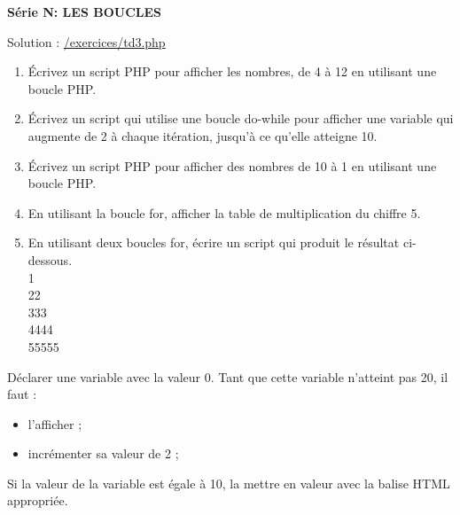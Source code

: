 \documentclass[10pt,a4paper,notitlepage]{article}
\begin{document}
	
	\begin{center}
		\large{\textbf{Série N: \textsc{LES BOUCLES}}}
	\end{center}
	
	Solution : \href{https://exercicesdephp.000webhostapp.com/exercices/td3.php}{\color{blue} /exercices/td3.php}
	\begin{definition}
		\hspace{2ex} 
		\begin{enumerate}
			\item Écrivez un script PHP pour afficher les nombres, de 4 à 12 en utilisant une boucle PHP. 
			\item Écrivez un script  qui utilise une boucle do-while pour afficher une variable qui augmente de 2 à chaque itération, jusqu'à ce qu'elle atteigne 10.
			\item Écrivez un script PHP pour afficher des nombres de 10 à 1 en utilisant une boucle PHP.
			\item En utilisant la boucle for, afficher la table de multiplication du chiffre 5.
			\item En utilisant deux boucles for, écrire un script qui produit le résultat ci-dessous.\\
			1\\
			22\\
			333\\
			4444\\
			55555
		\end{enumerate}
		
	\end{definition}
	\begin{definition}
		\hspace{2ex} Déclarer une variable avec la valeur 0. Tant que cette variable n'atteint pas 20, il faut :
		\begin{itemize}
			\item l'afficher ;
			\item incrémenter sa valeur de 2 ;
		\end{itemize}
		Si la valeur de la variable est égale à 10, la mettre en valeur avec la balise HTML appropriée.
	\end{definition}
\end{document}
